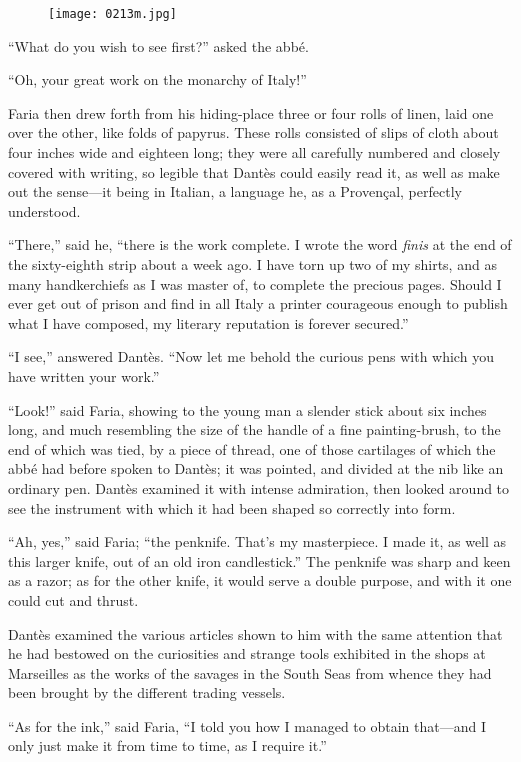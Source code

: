 \begin{figure}[ht]
\texttt{[image: 0213m.jpg]}
\end{figure}

“What do you wish to see first?” asked the abbé.

“Oh, your great work on the monarchy of Italy!”

Faria then drew forth from his hiding-place three or four rolls of
linen, laid one over the other, like folds of papyrus. These rolls
consisted of slips of cloth about four inches wide and eighteen long;
they were all carefully numbered and closely covered with writing, so
legible that Dantès could easily read it, as well as make out the
sense—it being in Italian, a language he, as a Provençal, perfectly
understood.

“There,” said he, “there is the work complete. I wrote the word \textit{finis}
at the end of the sixty-eighth strip about a week ago. I have torn up
two of my shirts, and as many handkerchiefs as I was master of, to
complete the precious pages. Should I ever get out of prison and find
in all Italy a printer courageous enough to publish what I have
composed, my literary reputation is forever secured.”

“I see,” answered Dantès. “Now let me behold the curious pens with
which you have written your work.”

“Look!” said Faria, showing to the young man a slender stick about six
inches long, and much resembling the size of the handle of a fine
painting-brush, to the end of which was tied, by a piece of thread, one
of those cartilages of which the abbé had before spoken to Dantès; it
was pointed, and divided at the nib like an ordinary pen. Dantès
examined it with intense admiration, then looked around to see the
instrument with which it had been shaped so correctly into form.

“Ah, yes,” said Faria; “the penknife. That’s my masterpiece. I made it,
as well as this larger knife, out of an old iron candlestick.” The
penknife was sharp and keen as a razor; as for the other knife, it
would serve a double purpose, and with it one could cut and thrust.

Dantès examined the various articles shown to him with the same
attention that he had bestowed on the curiosities and strange tools
exhibited in the shops at Marseilles as the works of the savages in the
South Seas from whence they had been brought by the different trading
vessels.

“As for the ink,” said Faria, “I told you how I managed to obtain
that—and I only just make it from time to time, as I require it.”

